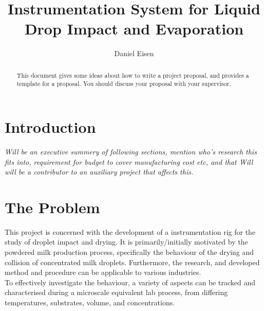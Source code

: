 \documentclass[11pt, a4paper, twoside, openright]{report}
\title{Instrumentation System for Liquid Drop Impact and Evaporation}
\author{Daniel Eisen}
\date{}
\begin{document}
\frontmatter


\begin{abstract}
  This document gives some ideas about how to write a project
  proposal, and provides a template for a proposal. You should discuss
  your proposal with your supervisor.
\end{abstract}


\maketitle
\tableofcontents



\mainmatter


\section{Introduction}
\textit{Will be an executive summery of following sections, mention who's research this fits into, requirement for budget to cover manufacturing cost etc, and that Will will be a contributor to an auxiliary project that affects this.}

\section{The Problem}
This project is concerned with the development of a instrumentation rig for the study of droplet impact and drying. It is primarily/initially motivated by the powdered milk production process, specifically the behaviour of the drying and collision of concentrated milk droplets. Furthermore, the research, and developed method and procedure can be applicable to various industries. \\

To effectively investigate the behaviour, a variety of aspects can be tracked and characterised during a microscale equivalent lab process, from differing temperatures, substrates, volume, and concentrations. \\
\end{document}
